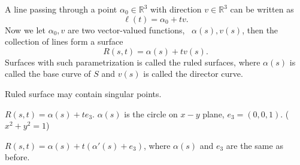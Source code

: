 \begin{exercise}
    A line passing through a point \(\alpha_0\in\mathbb{R}^3\) 
    with direction \(v\in \mathbb{R}^3\) can be written as 
    \[
        \ell(t)=\alpha_0 + t v.    
    \]
    Now we let \(\alpha_0,v\) are two vector-valued functions,
    \ie\ \(\alpha(s),v(s)\), then the collection of lines form 
    a surface 
    \[
        R(s,t)=\alpha(s)+t v(s).    
    \]
Surfaces with such parametrization is called the ruled surfaces, 
where \(\alpha(s)\) is called the base curve of \(S\) and 
\(v(s)\) is called the director curve.
\end{exercise}
\begin{remark}
    Ruled surface may contain singular points.
\end{remark}
\begin{example}
    \(R(s,t)=\alpha(s)+t e_3\). \(\alpha(s)\) is the circle on \(x-y\)
    plane, \(e_3=(0,0,1)\). (\(x^2+y^2=1\)) 
    \begin{center}
        \end{center}
\end{example}
\begin{example}\label{a ruled surface}
    \(R(s,t)=\alpha(s)+t\left(\alpha'(s)+e_3\right)\), where \(\alpha(s)\)
     and \(e_3\) are the same as before.
    \begin{center}
    \end{center}
\end{example}
